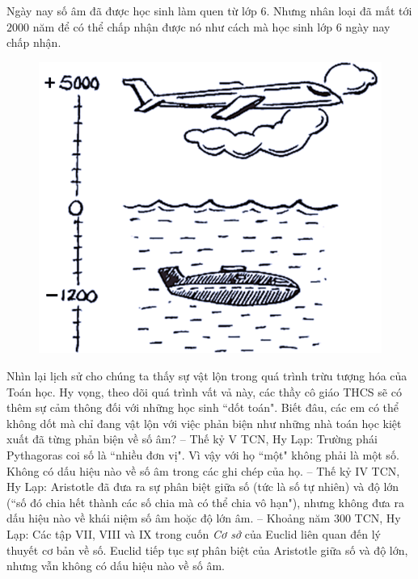 \begin{multicols}{2}	
	Ngày nay số âm đã được học sinh làm quen từ lớp $6$. Nhưng nhân loại đã mất tới $2000$ năm để có thể chấp nhận được nó như cách mà học sinh lớp $6$ ngày nay chấp nhận. 
	\begin{figure}[H]
		\vspace*{-5pt}
		\centering
		\captionsetup{labelformat= empty, justification=centering}
		\includegraphics[width= 1\linewidth]{1}
		\vspace*{-10pt}
	\end{figure}
	Nhìn lại lịch sử cho chúng ta thấy sự vật lộn trong quá trình trừu tượng hóa của Toán học. Hy vọng, theo dõi quá trình vất vả này, các thầy cô giáo THCS sẽ có thêm sự cảm thông đối với những học sinh ``dốt toán". Biết đâu, các em có thể không dốt mà chỉ đang vật lộn với việc phản biện như những nhà toán học kiệt xuất đã từng phản biện về số âm? 
	\vskip 0.1cm
	-- Thế kỷ V TCN, Hy Lạp: Trường phái Pythagoras coi số là ``nhiều đơn vị". Vì vậy với họ ``một" không phải là một số. Không có dấu hiệu nào về số âm trong các ghi chép của họ.
	\vskip 0.1cm
	-- Thế kỷ IV TCN, Hy Lạp: Aristotle đã đưa ra sự phân biệt giữa số (tức là số tự nhiên) và độ lớn (``số đó chia hết thành các số chia mà có thể chia vô hạn"), nhưng không đưa ra dấu hiệu nào về khái niệm số âm hoặc độ lớn âm.
	\vskip 0.1cm
	-- Khoảng năm $300$ TCN, Hy Lạp: Các tập VII, VIII và IX trong cuốn \textit{Cơ sở} của Euclid liên quan đến lý thuyết cơ bản về số. Euclid tiếp tục sự phân biệt của Aristotle giữa số và độ lớn, nhưng vẫn không có dấu hiệu nào về số âm.

\end{multicols}
